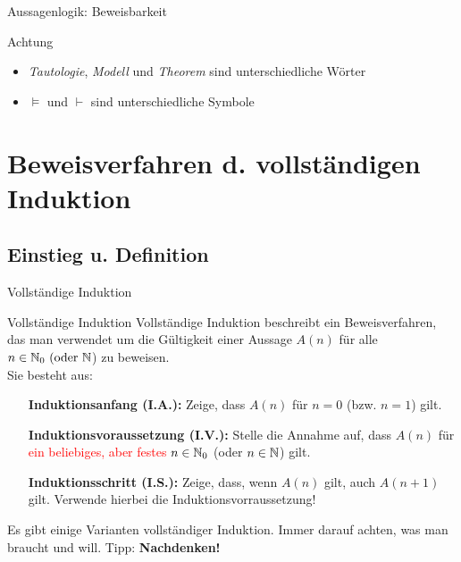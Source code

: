 \begin{frame}{Aussagenlogik: Beweisbarkeit}    
	\begin{alertblock}{Achtung}
		\begin{itemize}
			\item \emph{Tautologie}, \emph{Modell} und \emph{Theorem} sind unterschiedliche Wörter
			\item $\models$ und $\vdash$ sind unterschiedliche Symbole
		\end{itemize}
	\end{alertblock}
\end{frame}

\section[Vollständige Induktion]{Beweisverfahren d. vollständigen Induktion}
\subsection{Einstieg u. Definition}
\begin{frame}{Vollständige Induktion}
	\begin{block}{Vollständige Induktion}
		Vollständige Induktion beschreibt ein Beweisverfahren, das man verwendet um die Gültigkeit einer Aussage \(A(n)\) für alle \(n \in \mathbb{N}_{0} \text{ (oder } \mathbb{N}\)) zu beweisen.\\
		
		Sie besteht aus:
		\begin{itemize}
			\item [\textbf{Induktionsanfang (I.A.):}] Zeige, dass \(A(n)\) für \(n=0\) (bzw. \(n=1\)) gilt.
			\item [\textbf{Induktionsvoraussetzung (I.V.):}] Stelle die Annahme auf, dass \(A(n)\) für \textcolor{red}{ein beliebiges, aber festes} \(n \in \mathbb{N}_{0}\) (oder \(n \in \mathbb{N}\)) gilt.
			\item [\textbf{Induktionsschritt (I.S.):}] Zeige, dass, wenn \(A(n)\) gilt, auch \(A(n+1)\) gilt. Verwende hierbei die Induktionsvorraussetzung!
		\end{itemize}
	\end{block}

	\begin{alertblock}{}
		Es gibt einige Varianten vollständiger Induktion. Immer darauf achten, was man braucht und will. Tipp: \textbf{Nachdenken!}
	\end{alertblock}
\end{frame}
